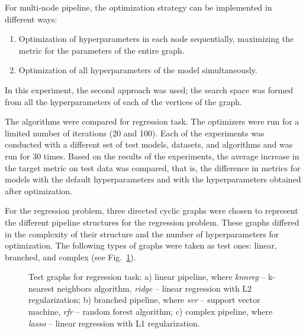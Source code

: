 \documentclass[iicol]{sn-jnl}
\theoremstyle{thmstyleone}%
\theoremstyle{thmstyletwo}%
\theoremstyle{thmstylethree}%
\begin{document}
For multi-node pipeline, the optimization strategy can be implemented in different ways:
\begin{enumerate}
    \item Optimization of hyperparameters in each node sequentially, maximizing the metric for the parameters of the entire graph.
    \item Optimization of all hyperparameters of the model simultaneously.
\end{enumerate}

In this experiment, the second approach was used; the search space was formed from all the hyperparameters of each of the vertices of the graph.

The algorithms were compared for regression task. %
The optimizers were run for a limited number of iterations (20 and 100). Each of the experiments was conducted with a different set of test models, datasets, and algorithms and was run for 30 times. Based on the results of the experiments, the average increase in the target metric on test data was compared, that is, the difference in metrics for models with the default hyperparameters and with the hyperparameters obtained after optimization.

For the regression problem, three directed cyclic graphs were chosen to represent the different pipeline structures for the regression problem. These graphs differed in the complexity of their structure and the number of hyperparameters for optimization. The following types of graphs were taken as test ones: linear, branched, and complex (see Fig.~\ref{fig_reg_pipe}).

\begin{figure}
\caption{Test graphs for regression task: a) linear pipeline, where \textit{knnreg} -- k-nearest neighbors algorithm, \textit{ridge} -- linear regression with L2 regularization; b) branched pipeline, where \textit{svr} -- support vector machine, \textit{rfr} -- random forest algorithm; c) complex pipeline, where \textit{lasso} -- linear regression with L1 regularization.}\label{fig_reg_pipe}
\end{figure} 
\end{document}
